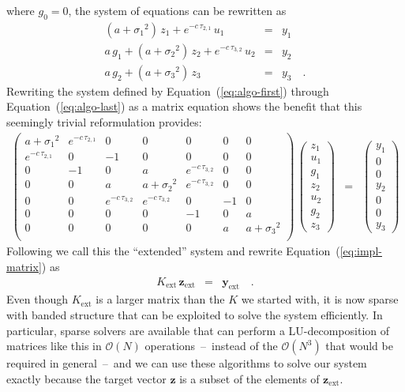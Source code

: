 \documentclass[manuscript, letterpaper]{aastex6}
\renewcommand{\eqref}[1]{\ref{eq:#1}}
\newcommand{\Eq}[1]{Equation~(\eqref{#1})}
\newcommand{\eq}[1]{\Eq{#1}}
\newcommand{\eqlabel}[1]{\label{eq:#1}}
\newcommand{\bvec}[1]{{\ensuremath{\boldsymbol{#1}}}}
\begin{document}
where $g_{0} = 0$,
the system of equations can be rewritten as
\begin{eqnarray}
(a+{\sigma_1}^2)\,z_1 + e^{-c\,\tau_{2,1}}\,u_1 &=& y_1 \\
a\,g_1 + (a+{\sigma_2}^2)\,z_2 + e^{-c\,\tau_{3,2}}\,u_2 &=& y_2 \\
a\,g_2 + (a+{\sigma_3}^2)\,z_3 &=& y_3 \quad. \eqlabel{algo-last}
\end{eqnarray}
Rewriting the system defined by \eq{algo-first} through \eq{algo-last}
as a matrix equation shows the benefit that this seemingly trivial
reformulation provides:
\begin{eqnarray}
\begin{pmatrix}
    a+{\sigma_1}^2 & e^{-c\,\tau_{2,1}} & 0 & 0 & 0 & 0 & 0 \\
    e^{-c\,\tau_{2,1}} & 0 & -1 & 0 & 0 & 0 & 0 \\
    0 & -1 & 0 & a & e^{-c\,\tau_{3,2}} & 0 & 0 \\
    0 & 0 & a & a+{\sigma_2}^2 & e^{-c\,\tau_{3,2}} & 0 & 0 \\
    0 & 0 & e^{-c\,\tau_{3,2}} & e^{-c\,\tau_{3,2}} & 0 & -1 & 0 \\
    0 & 0 & 0 & 0 & -1 & 0 & a \\
    0 & 0 & 0 & 0 & 0 & a & a+{\sigma_3}^2 \\
\end{pmatrix}\,
\begin{pmatrix}
    z_1 \\ u_1 \\ g_1 \\ z_2 \\ u_2 \\ g_2 \\ z_3
\end{pmatrix} &=&
\begin{pmatrix}
    y_1 \\ 0 \\ 0 \\ y_2 \\ 0 \\ 0 \\ y_3
\end{pmatrix}\nonumber
\end{eqnarray}
Following \citet{Ambikasaran:2015} we call this the ``extended'' system and
rewrite \eq{impl-matrix} as
\begin{eqnarray}
    K_\mathrm{ext}\,\bvec{z}_\mathrm{ext} &=& \bvec{y}_\mathrm{ext} \quad.
\end{eqnarray}
Even though $K_\mathrm{ext}$ is a larger matrix than the $K$ we started
with, it is now sparse with banded structure that can be exploited to solve
the system efficiently.
In particular, sparse solvers are available that can perform a
LU-decomposition of matrices like this in $\mathcal{O}(N)$
operations~--~instead of the $\mathcal{O}(N^3)$ that would be required in
general~--~and we can use these algorithms to solve our system
exactly because the target vector $\bvec{z}$ is a subset of the elements of
$\bvec{z}_\mathrm{ext}$.
\end{document}
